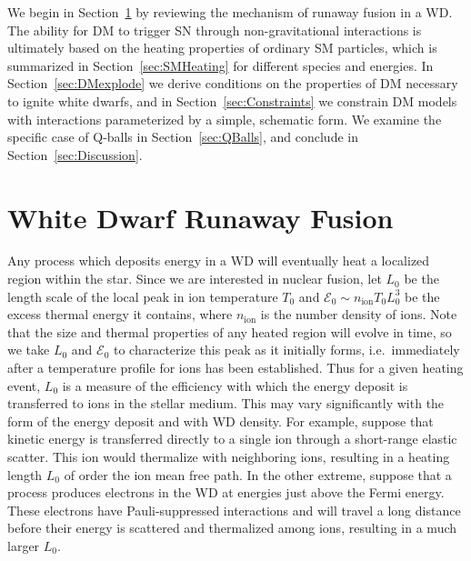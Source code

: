 \documentclass[twocolumn,showpacs,preprintnumbers,amsmath,amssymb,prd]{revtex4}
\newcommand{\Ez}{\mathcal{E}_0}
\begin{document}
We begin in Section~\ref{sec:Review} by reviewing the mechanism of runaway fusion in a WD. 
The ability for DM to trigger SN through non-gravitational interactions is ultimately based on the heating properties of ordinary SM particles, which is summarized in Section~\ref{sec:SMHeating} for different species and energies.
In Section~\ref{sec:DMexplode} we derive conditions on the properties of DM necessary to ignite white dwarfs, and in Section~\ref{sec:Constraints} we constrain DM models with interactions parameterized by a simple, schematic form.  
We examine the specific case of Q-balls in Section~\ref{sec:QBalls}, and conclude in Section~\ref{sec:Discussion}.

\section{White Dwarf Runaway Fusion}
\label{sec:Review}

Any process which deposits energy in a WD will eventually heat a localized region within the star. 
Since we are interested in nuclear fusion, let $L_0$ be the length scale of the local peak in ion temperature $T_0$ and $\Ez \sim n_\text{ion} T_0 L_0^3$ be the excess thermal energy it contains, where $n_\text{ion}$ is the number density of ions. 
Note that the size and thermal properties of any heated region will evolve in time, so we take $L_0$ and $\Ez$ to characterize this peak as it initially forms, i.e.\ immediately after a temperature profile for ions has been established.
Thus for a given heating event, $L_0$ is a measure of the efficiency with which the energy deposit is transferred to ions in the stellar medium.
This may vary significantly with the form of the energy deposit and with WD density.
For example, suppose that kinetic energy is transferred directly to a single ion through a short-range elastic scatter.
This ion would thermalize with neighboring ions, resulting in a heating length $L_0$ of order the ion mean free path.
In the other extreme, suppose that a process produces electrons in the WD at energies just above the Fermi energy.
These electrons have Pauli-suppressed interactions and will travel a long distance before their energy is scattered and thermalized among ions, resulting in a much larger $L_0$.
\end{document}
